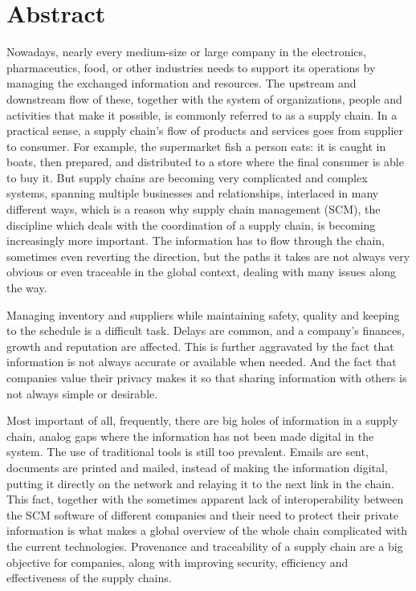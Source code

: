 \chapter{Abstract}

Nowadays, nearly every medium-size or large company in the electronics, pharmaceutics, food, or other industries needs to support its operations by managing the exchanged information and resources. The upstream and downstream flow of these, together with the system of organizations, people and activities that make it possible, is commonly referred to as a supply chain. In a practical sense, a supply chain’s flow of products and services goes from supplier to consumer. For example, the supermarket fish a person eats: it is caught in boats, then prepared, and distributed to a store where the final consumer is able to buy it. But supply chains are becoming very complicated and complex systems, spanning multiple businesses and relationships, interlaced in many different ways, which is a reason why supply chain management (SCM), the discipline which deals with the coordination of a supply chain, is becoming increasingly more important.  The information has to flow through the chain, sometimes even reverting the direction, but the paths it takes are not always very obvious or even traceable in the global context, dealing with many issues along the way.

Managing inventory and suppliers while maintaining safety, quality and keeping to the schedule is a difficult task. Delays are common, and a company’s finances, growth and reputation are affected. This is further aggravated by the fact that information is not always accurate or available when needed. And the fact that companies value their privacy makes it so that sharing information with others is not always simple or desirable. 

Most important of all, frequently, there are big holes of information in a supply chain, analog gaps where the information has not been made digital in the system. The use of traditional tools is still too prevalent. Emails are sent, documents are printed and mailed, instead of making the information digital, putting  it directly on the network and relaying it to the next link in the chain. This fact, together with the sometimes apparent lack of interoperability between the SCM software of different companies and their need to protect their private information is what makes a global overview of the whole chain complicated with the current technologies. Provenance and traceability of a supply chain are a big objective for companies, along with improving security, efficiency and effectiveness of the supply chains.

